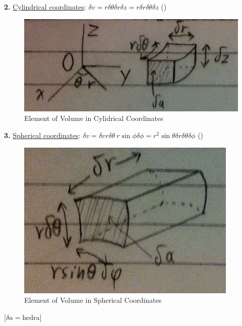 \documentclass[12pt]{article}
\begin{document}
\begin{flushleft}
	\textbf{2.} \uline{Cylindrical coordinates}: $\displaystyle \delta v = r \delta \theta \delta r \delta z = r \delta r \delta \theta \delta z$ \linebreak () \linebreak 
	
	\begin{figure}[H]
	\centering
	\includegraphics[scale=0.6]{cylindricalMomentOfVolume}
	\caption{Element of Volume in Cylidrical Coordinates}
	\label{fig:cylindricalMomentOfVolume}
	\end{figure}
	
	\textbf{3.} \uline{Spherical coordinates}: $\displaystyle \delta v = \delta v r \delta \theta \ r\sin \phi \delta \phi = r^2 \sin \theta \delta r \delta \theta \delta \phi$ () \linebreak 
	
	\begin{figure}[H]
	\centering
	\includegraphics[scale=0.6]{sphericalMomentOfVolume}
	\caption{Element of Volume in Spherical Coordinates}
	\label{fig:sphericalMomentOfVolume}
	\end{figure}
	
	[$\delta a = \text{hedra}$] \linebreak 


\end{flushleft}
\end{document}
